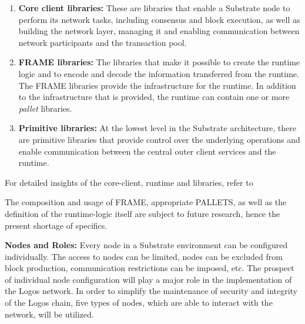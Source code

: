 \documentclass[]{article}
\begin{document}
\begin{enumerate}[label=\textbullet]
	\item\textbf{Core client libraries:}
    These are libraries that enable a Substrate node to perform its network tasks, including consensus and block execution, as well as building the network layer, managing it and enabling communication between network participants and the transaction pool. 
	
	\item\textbf{FRAME libraries:} 
    The libraries that make it possible to create the runtime logic and to encode and decode the information transferred from the runtime.
    The FRAME libraries provide the infrastructure for the runtime.
    In addition to the infrastructure that is provided, the runtime can contain one or more \textit{pallet} libraries.    
	
	\item\textbf{Primitive libraries:} 
	At the lowest level in the Substrate architecture, there are primitive libraries that provide control over the underlying operations and enable communication between the central outer client services and the runtime.	
\end{enumerate}
For detailed insights of the core-client, runtime and libraries, refer to \cite{SubstrateDoc-arch}

The composition and usage of FRAME, appropriate PALLETS, as well as the definition of the runtime-logic itself are subject to future research, hence the present shortage of specifics.
\newline

\textbf{Nodes and Roles:}
Every node in a Substrate environment can be configured individually. 
The access to nodes can be limited, nodes can be excluded from block production, communication restrictions can be imposed, etc.
The prospect of individual node configuration will play a major role in the implementation of the Logos network.
In order to simplify the maintenance of security and integrity of the Logos chain, five types of nodes, which are able to interact with the network, will be utilized. 
\end{document}
